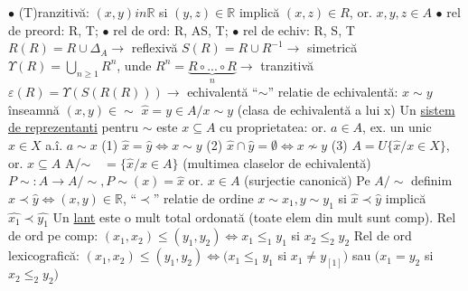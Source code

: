 \documentclass[8pt,twocolumn]{extarticle}
\begin{document}
	$\bullet$ (T)ranzitivă: $(x, y) in \mathbb{R}$ si $(y, z) \in \mathbb{R}$ implică $(x, z) \in R$, or. $x, y, z \in A$ \newline
	$\bullet$ rel de preord: R, T; $\bullet$ rel de ord: R, AS, T;	$\bullet$ rel de echiv: R, S, T \newline
	$R(R) = R \cup \Delta _{A} \rightarrow$ reflexivă \newline
	$S(R) = R \cup R^{-1} \rightarrow$ simetrică \newline
	$\Upsilon(R) = \bigcup_{n \geq 1} R^{n}$, unde $R^{n} = \underset{n}{\underbrace{R \circ ... \circ R}} \rightarrow$ tranzitivă \newline
	$\varepsilon(R) = \Upsilon(S(R(R))) \rightarrow$ echivalentă \newline
	``$\sim$'' relatie de echivalentă: $x \sim y$ înseamnă $(x, y) \in \sim$ \newline
	$\hat{x} = {y \in A / x \sim y}$ (clasa de echivalentă a lui x) \newline
	Un \underline{sistem de reprezentanti} pentru $\sim$ este $x \subseteq A$ cu proprietatea: \newline
	or. $a \in A$, ex. un unic $x \in X$ a.î. $a \sim x$ \newline
	(1) $\hat{x} = \hat{y} \Leftrightarrow x \sim y$ \newline
	(2) $\hat{x} \cap \hat{y} = \emptyset \Leftrightarrow x \not\sim y$ \newline
	(3) $A = U \{ \hat{x} / x \in X \}$, or. $x \subseteq A$ \newline
	A/$\sim \quad = \{ \hat{x} / x \in A \}$ (multimea claselor de echivalentă) \newline
	$P \sim : A \rightarrow A/\sim, P\sim(x) = \hat{x}$ or. $x \in A$ (surjectie canonică) \newline
	Pe $A/\sim$ definim $\hat{x} \prec \hat{y} \Leftrightarrow (x, y) \in \mathbb{R}$, ``$\prec$'' relatie de ordine $x \sim x_{1}, y \sim y_{1}$ si $\hat{x} \prec \hat{y}$ implică $\hat{x_{1}} \prec \hat{y_{1}}$ \newline
	Un \underline{lant} este o mult total ordonată (toate elem din mult sunt comp). \newline
	Rel de ord pe comp: $(x_{1}, x_{2}) \leq (y_{1}, y_{2}) \Leftrightarrow x_{1} \leq _{1} y_{1}$ si $x_{2} \leq _{2} y_{2}$ \newline
	Rel de ord lexicografică: \newline
	$(x_{1}, x_{2}) \leq (y_{1}, y_{2}) \Leftrightarrow (x_{1} \leq _{1} y_{1}$ si $x_{1} \neq y_[1])$ sau $(x_{1} = y_{2}$ si $x_{2} \leq _{2} y_{2})$ \newline
\end{document}
